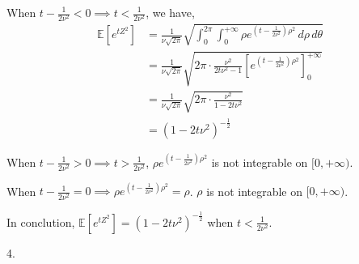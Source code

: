 When $t-\frac{1}{2\nu^2}<0\implies t<\frac{1}{2\nu^2}$, we have,
\begin{align}
    \nonumber \mathbb{E}\left[ e^{tZ^2} \right] &=\frac{1}{\nu \sqrt{2\pi}}\sqrt{ \int_{0}^{2\pi}\int_{0 }^{+\infty }\rho e^{(t-\frac{1}{2\nu^2})\rho^2}\,d\rho\,d\theta   }\\
    \nonumber &=\frac{1}{\nu \sqrt{2\pi}}\sqrt{ 2\pi\cdot\frac{\nu^2}{2t\nu^2-1}\left[e^{ (t-\frac{1}{2\nu^2})\rho^2}\right]_{0}^{+\infty} }\\
    \nonumber &=\frac{1}{\nu \sqrt{2\pi}}\sqrt{2\pi\cdot\frac{\nu^2}{1-2t\nu^2}}\\
    \nonumber &=(1-2t\nu^2)^{-\frac{1}{2}}
\end{align}

When $t-\frac{1}{2\nu^2}>0\implies t>\frac{1}{2\nu^2}$, %
$\rho e^{(t-\frac{1}{2\nu^2})\rho^2}$ is not integrable on $[0, +\infty )$.%

When $t-\frac{1}{2\nu^2}=0 \implies \rho e^{(t-\frac{1}{2\nu^2})\rho^2}=\rho$. $\rho$ is not integrable on $[0, +\infty )$.

In conclution, $\mathbb{E}\left[ e^{tZ^2} \right]=(1-2t\nu^2)^{-\frac{1}{2}}$ when $t<\frac{1}{2\nu^2}$.

4.\\

